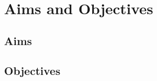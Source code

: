 \section{Aims and Objectives} \label{aims_and_objectives}

\subsection{Aims}

\subsection{Objectives}
